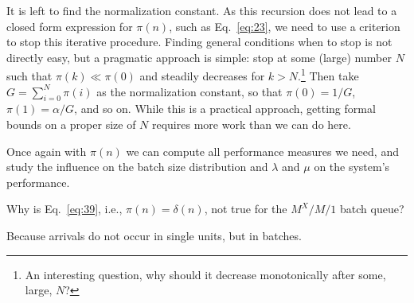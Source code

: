 It is left to find the normalization constant.
As this recursion does not lead to a closed form expression for $\pi(n)$, such as Eq.~\eqref{eq:23}, we need to use a criterion to stop this iterative procedure.
Finding general conditions when to stop is not directly easy, but a pragmatic approach is simple: stop at some (large) number $N$ such that $\pi(k)\ll \pi(0)$ and steadily decreases for $k>N$.\footnote{An interesting question, why should it decrease monotonically after some, large, $N$?}
Then take $G=\sum_{i=0}^N \pi(i)$ as the normalization constant, so that $\pi(0)=1/G$, $\pi(1)=\alpha/G$, and so on.
While this is a practical approach, getting formal bounds on a proper size of $N$ requires more work than we can do here.

Once again with $\pi(n)$ we can compute all performance measures we need, and study the influence on the batch size distribution and $\lambda$ and $\mu$ on the system's performance.

\begin{exercise}{\faFlask}
  Why is Eq.~\eqref{eq:39}, i.e., $\pi(n)=\delta(n)$, not true for the
  $M^X/M/1$ batch queue?
\begin{solution}
 Because arrivals do not occur in single units, but in batches.
\end{solution}
\end{exercise}

